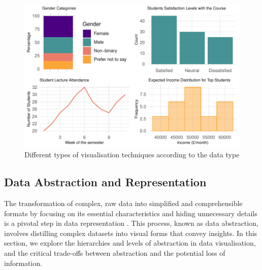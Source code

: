 \documentclass{article}\usepackage[]{graphicx}\usepackage[]{xcolor}
\makeatletter
\def\maxwidth{ %
  \ifdim\Gin@nat@width>\linewidth
    \linewidth
  \else
    \Gin@nat@width
  \fi
}
\newenvironment{knitrout}{}{} %
\numberwithin{equation}{section}
\makeatother
\begin{document}
\begin{knitrout}\scriptsize
{}\color{fgcolor}\begin{figure}[H]

{\centering \includegraphics[width=\maxwidth]{figure/beamer-data-plots-1} 

}

\caption[Different types of visualisation techniques according to the data type]{Different types of visualisation techniques according to the data type}\label{fig:data-plots}
\end{figure}

\end{knitrout}

\subsection{Data Abstraction and Representation}
The transformation of complex, raw data into simplified and comprehensible formats by focusing on its essential characteristics and hiding unnecessary details is a pivotal step in data representation \cite{ward2010interactive}. This process, known as data abstraction, involves distilling complex datasets into visual forms that convey insights. In this section, we explore the hierarchies and levels of abstraction in data visualisation, and the critical trade-offs between abstraction and the potential loss of information.
\end{document}
